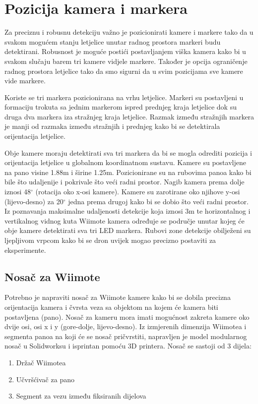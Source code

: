 \documentclass[times, utf8, diplomski]{fer}
\begin{document}
\section{Pozicija kamera i markera}
Za preciznu i robusnu detekciju važno je pozicionirati kamere i markere tako da u svakom mogućem stanju letjelice unutar radnog prostora markeri budu detektirani. Robusnost je moguće postići postavljanjem viška kamera kako bi u svakom slučaju barem tri kamere vidjele markere. Također je opcija ograničenje radnog prostora letjelice tako da smo sigurni da u svim pozicijama sve kamere vide markere. 

Koriste se tri markera pozicionirana na vrhu letjelice. Markeri su postavljeni u formaciju trokuta sa jednim markerom ispred prednjeg kraja letjelice dok su druga dva markera iza stražnjeg kraja letjelice. Razmak između stražnjih markera je manji od razmaka između stražnjih i prednjeg kako bi se detektirala orijentacija letjelice.

Obje kamere moraju detektirati sva tri markera da bi se mogla odrediti pozicija i orijentacija letjelice u globalnom koordinatnom sustavu. Kamere su postavljene na pano visine 1.88m i širine 1.25m. Pozicionirane su na rubovima panoa kako bi bile što udaljenije i pokrivale što veći radni prostor. Nagib kamera prema dolje iznosi 48$^{\circ}$ (rotacija oko x-osi kamere). Kamere su zarotirane oko njihove y-osi (lijevo-desno) za 20$^{\circ}$ jedna prema drugoj kako bi se dobio što veći radni prostor. Iz poznavanja maksimalne udaljenosti detekcije koja iznosi 3m te horizontalnog i vertikalnog vidnog kuta Wiimote kamera određuje se područje unutar kojeg će obje kamere detektirati sva tri LED markera. Rubovi zone detekcije obilježeni su ljepljivom vrpcom kako bi se dron uvijek mogao precizno postaviti za eksperimente. 

\subsection{Nosač za Wiimote}
Potrebno je napraviti nosač za Wiimote kamere kako bi se dobila precizna orijentacija kamera i čvrsta veza sa objektom na kojem će kamera biti postavljena (pano). Nosač za kameru mora imati mogućnost zakreta kamere oko dvije osi, osi x i y (gore-dolje, lijevo-desno). Iz izmjerenih dimenzija Wiimotea i segmenta panoa na koji će se nosač pričvrstiti, napravljen je model modularnog nosač u Solidworksu i isprintan pomoću 3D printera. Nosač se sastoji od 3 dijela:

\begin{enumerate}
	\item Držač Wiimotea
	\item Učvršćivač za pano
	\item Segment za vezu između fiksiranih dijelova 
\end{enumerate}
\end{document}
